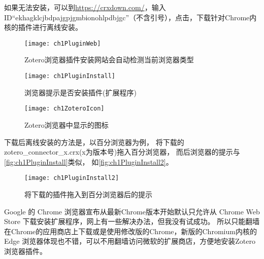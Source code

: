 \documentclass[theorem=false,mathfont=none,openany,sub3section]{easybook}
\begin{document}
如果无法安装，可以到\href{https://crxdown.com/}
{https://crxdown.com/}，输入ID“ekhagklcjbdpajgpjgmbionohlpdbjgc”（不含引号），点击，下载针对Chrome内核的插件进行离线安装。
\begin{figure}[htbp]
  \centering
  \texttt{[image: ch1PluginWeb]}
  \caption{Zotero浏览器插件安装网站会自动检测当前浏览器类型}
  \label{fig:ch1PluginWeb}
\end{figure}
\begin{figure}[htbp]
  \centering
  \texttt{[image: ch1PluginInstall]}
  \caption{浏览器提示是否安装插件(扩展程序)}
  \label{fig:ch1PluginInstall}
\end{figure}
\begin{figure}[htbp]
  \centering
  \texttt{[image: ch1ZoteroIcon]}
  \caption{Zotero浏览器中显示的图标}
  \label{fig:ch1ZoteroIcon}
\end{figure}

下载后离线安装的方法是，以百分浏览器为例，
将下载的zotero\_connector\_x.crx(x为版本号)拖入百分浏览器，
而后浏览器的提示与\autoref{fig:ch1PluginInstall}类似，
如\autoref{fig:ch1PluginInstall2}。
\begin{figure}[htbp]
  \centering
  \texttt{[image: ch1PluginInstall2]}
  \caption{将下载的插件拖入到百分浏览器后的提示}
  \label{fig:ch1PluginInstall2}
\end{figure}

Google 的 Chrome 浏览器宣布从最新Chrome版本开始默认只允许从 Chrome Web Store
下载安装扩展程序，网上有一些解决办法，但我没有试成功。
所以只能翻墙在Chrome的应用商店上下载或是使用修改版的Chrome，新版的Chromium内核的Edge
浏览器体现也不错，可以不用翻墙访问微软的扩展商店，方便地安装Zotero浏览器插件。
\end{document}
